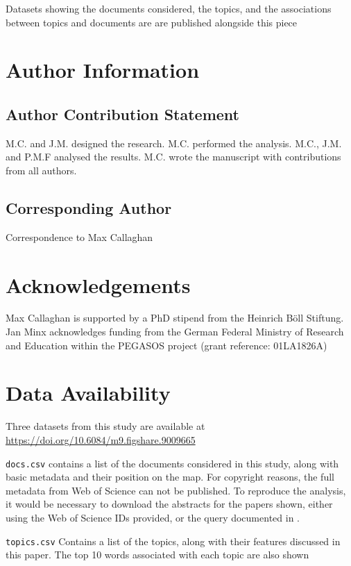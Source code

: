 \documentclass{article}
\begin{document}
\begin{linenumbers}
		Datasets showing the documents considered, the topics, and the associations between topics and documents are are published alongside this piece \cite{Callaghan2019}
		
		
	\end{linenumbers}

	\section*{Author Information}
	
	\subsection*{Author Contribution Statement}
	M.C. and J.M. designed the research. M.C. performed the analysis. M.C., J.M. and P.M.F analysed the results. M.C. wrote the manuscript with contributions from all authors.
	
	\subsection*{Corresponding Author}
	Correspondence to Max Callaghan
	
	\section*{Acknowledgements}
	Max Callaghan is supported by a PhD stipend from the Heinrich Böll Stiftung. Jan Minx acknowledges funding from the German Federal Ministry of Research and Education within the PEGASOS project (grant reference: 01LA1826A)
	
	\section*{Data Availability}

	Three datasets from this study are available at \url{https://doi.org/10.6084/m9.figshare.9009665}
	
	\medskip\noindent
	\texttt{docs.csv} contains a list of the documents considered in this study, along with basic metadata and their position on the map. For copyright reasons, the full metadata from Web of Science can not be published. To reproduce the analysis, it would be necessary to download the abstracts for the papers shown, either using the Web of Science IDs provided, or the query documented in \cite{Grieneisen2011}.
	
	\medskip\noindent
	\texttt{topics.csv} Contains a list of the topics, along with their features discussed in this paper. The top 10 words associated with each topic are also shown
	
\end{document}
